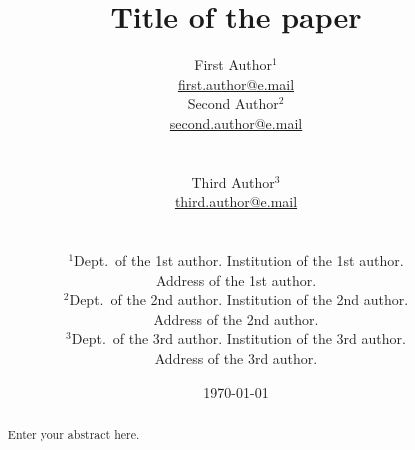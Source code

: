 \documentclass[10pt,twoside]{article}
\theoremstyle{remark}
\theoremstyle{definition}
\begin{document}
\title{Title of the paper}

\author{
\begin{minipage}[c]{0.3\linewidth}
\centering
First Author$^{1}$\\
\url{first.author@e.mail}
\end{minipage}
\begin{minipage}[c]{0.4\linewidth}
\centering
  Second Author$^{2}$\\
  \url{second.author@e.mail}
\end{minipage}\\ [0,3in]
\begin{minipage}[c]{0.4\linewidth}
\centering
  Third Author$^{3}$\\
  \url{third.author@e.mail}
\end{minipage}\\
\begin{minipage}[c]{0.9\linewidth}
\small
\centering
\vspace{\baselineskip}\noindent
$^{1}$Dept.~of the 1st author. Institution of the 1st author.\\
  Address of the 1st author.\\
\vspace{0.75\baselineskip}
$^{2}$Dept.~of the 2nd author. Institution of the 2nd author.\\
  Address of the 2nd author.\\
\vspace{0.75\baselineskip}
$^{3}$Dept.~of the 3rd author. Institution of the 3rd author.\\
  Address of the 3rd author.\\
\vspace{0.75\baselineskip}
\end{minipage}}

\date{\today}
\maketitle

\begin{abstract}
Enter your abstract here.


\end{abstract}
\end{document}
